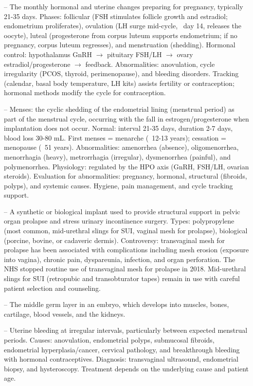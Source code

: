 -- The monthly hormonal and uterine changes preparing for pregnancy, typically 21-35 days. Phases: follicular (FSH stimulates follicle growth and estradiol; endometrium proliferates), ovulation (LH surge mid-cycle, ~day 14, releases the oocyte), luteal (progesterone from corpus luteum supports endometrium; if no pregnancy, corpus luteum regresses), and menstruation (shedding). Hormonal control: hypothalamus GnRH $\rightarrow$ pituitary FSH/LH $\rightarrow$ ovary estradiol/progesterone $\rightarrow$ feedback. Abnormalities: anovulation, cycle irregularity (PCOS, thyroid, perimenopause), and bleeding disorders. Tracking (calendar, basal body temperature, LH kits) assists fertility or contraception; hormonal methods modify the cycle for contraception.

-- Menses: the cyclic shedding of the endometrial lining (menstrual period) as part of the menstrual cycle, occurring with the fall in estrogen/progesterone when implantation does not occur. Normal: interval 21-35 days, duration 2-7 days, blood loss 30-80 mL. First menses = menarche (~12-13 years); cessation = menopause (~51 years). Abnormalities: amenorrhea (absence), oligomenorrhea, menorrhagia (heavy), metrorrhagia (irregular), dysmenorrhea (painful), and polymenorrhea. Physiology: regulated by the HPO axis (GnRH, FSH/LH, ovarian steroids). Evaluation for abnormalities: pregnancy, hormonal, structural (fibroids, polyps), and systemic causes. Hygiene, pain management, and cycle tracking support.

-- A synthetic or biological implant used to provide structural support in pelvic organ prolapse and stress urinary incontinence surgery. Types: polypropylene (most common, mid-urethral slings for SUI, vaginal mesh for prolapse), biological (porcine, bovine, or cadaveric dermis). Controversy: transvaginal mesh for prolapse has been associated with complications including mesh erosion (exposure into vagina), chronic pain, dyspareunia, infection, and organ perforation. The NHS stopped routine use of transvaginal mesh for prolapse in 2018. Mid-urethral slings for SUI (retropubic and transobturator tapes) remain in use with careful patient selection and counseling.

-- The middle germ layer in an embryo, which develops into muscles, bones, cartilage, blood vessels, and the kidneys.

-- Uterine bleeding at irregular intervals, particularly between expected menstrual periods. Causes: anovulation, endometrial polyps, submucosal fibroids, endometrial hyperplasia/cancer, cervical pathology, and breakthrough bleeding with hormonal contraceptives. Diagnosis: transvaginal ultrasound, endometrial biopsy, and hysteroscopy. Treatment depends on the underlying cause and patient age.

